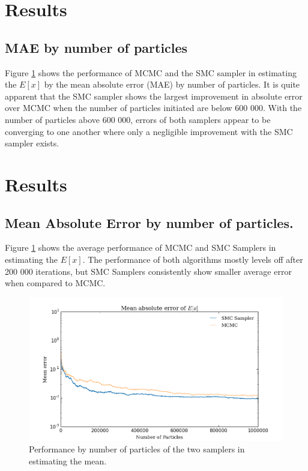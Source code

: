 \documentclass[12pt]{elsarticle}
\begin{document}
\section*{Results}
\subsection*{MAE by number of particles}
Figure \ref{ex} shows the performance of MCMC and the SMC sampler in estimating the $E[x]$ by the mean absolute error (MAE) by number of particles. It is quite apparent that the SMC sampler shows the largest improvement in absolute error over MCMC when the number of particles initiated are below 600 000. With the number of particles above 600 000, errors of both samplers appear to be converging to one another where only a negligible improvement with the SMC sampler exists.


\section*{Results}

\subsection*{Mean Absolute Error by number of particles. }
Figure \ref{ex} shows the average performance of MCMC and SMC Samplers in estimating the $E[x]$. The performance of both algorithms mostly levels off after 200 000 iterations, but SMC Samplers consistently show smaller average error when compared to MCMC. 


\begin{figure}[htbp]
\begin{center}
\includegraphics[width = \textwidth]{plots/E_X.png}
\caption{Performance by number of particles of the two samplers in estimating the mean.}
\label{ex}
\end{center}
\end{figure}
\end{document}
